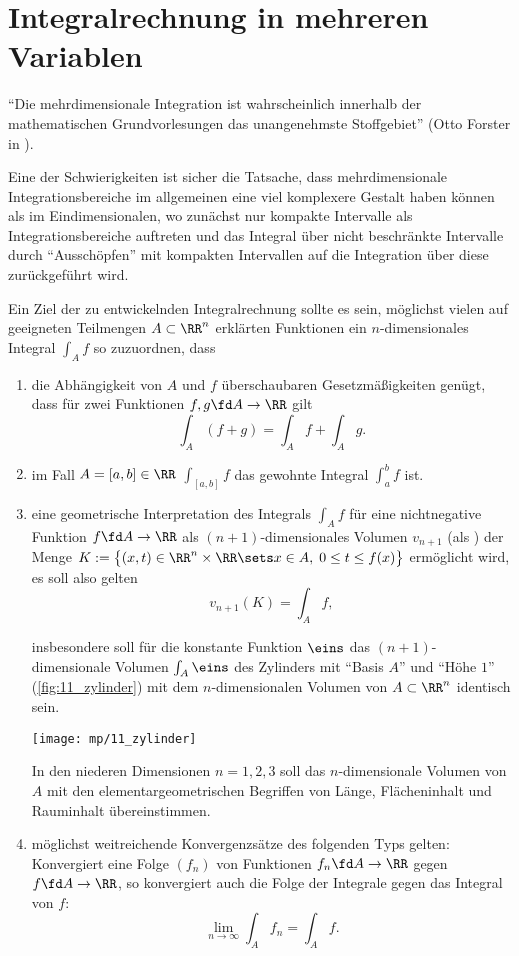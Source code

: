 \chapter{Integralrechnung in mehreren Variablen} 

"`Die mehrdimensionale Integration ist wahrscheinlich innerhalb der 
mathematischen Grundvorlesungen das unangenehmste Stoffgebiet"' (Otto 
Forster in \citep{Forster}).

Eine der Schwierigkeiten ist sicher die Tatsache, dass mehrdimensionale 
Integrationsbereiche im allgemeinen eine viel komplexere Gestalt haben können 
als im Eindimensionalen, wo zunächst nur kompakte Intervalle als 
Integrationsbereiche auftreten und das Integral über nicht beschränkte 
Intervalle durch "`Ausschöpfen"' mit kompakten Intervallen auf die 
Integration über diese zurückgeführt wird. 

Ein Ziel der zu entwickelnden Integralrechnung sollte es sein, möglichst 
vielen auf geeigneten Teilmengen $A\subset\RR^n$ erklärten Funktionen 
ein $n$-dimensionales Integral $\int_A f$ so zuzuordnen, dass 
\begin{enumerate}
\item die Abhängigkeit von $A$ und $f$ überschaubaren Gesetzmäßigkeiten 
  genügt, {\zB} dass für zwei Funktionen $f,g \fd A\to \RR$ gilt 
  \[
  \int_A (f+g) = \int_A f + \int_A g.
  \]
\item im Fall $A=[a,b]\in \RR$ $\int_{[a,b]} f$ das gewohnte Integral 
  $\int_a^b f$ ist. 
\item eine geometrische Interpretation des Integrals $\int_A f$ für eine 
  nichtnegative Funktion $f\fd A\to \RR$ als $(n+1)$-dimensionales Volumen 
  $v_{n+1}$ (als ) der Menge 
  $
  K := \big\{ (x,t) \in \RR^n \times \RR \sets x\in A, \; 0 \le t \le f(x) \big\}
  $ ermöglicht wird, es soll also gelten 
  \[
  v_{n+1}( K) =\int_A f,
  \]

  insbesondere soll für die konstante 
  Funktion $\eins$ das $(n+1)$-dimensionale Volumen $\int_A \eins$ des Zylinders 
  mit "`Basis $A$"' und "`Höhe $1$"' (\Abb\ref{fig:11_zylinder}) mit dem $n$-dimensionalen Volumen 
  von $A\subset\RR^n$ identisch sein. 

  \begin{center}
    \texttt{[image: mp/11\_zylinder]}
    \label{fig:11_zylinder}
  \end{center}

  In den niederen Dimensionen $n=1,2,3$ 
  soll das $n$-dimensionale Volumen von $A$ mit den elementargeometrischen 
  Begriffen von Länge, Flächeninhalt und Rauminhalt übereinstimmen. 
\item möglichst weitreichende Konvergenzsätze des folgenden Typs 
  gelten: Konvergiert eine Folge $(f_n)$ von Funktionen $f_n \fd A\to \RR$ 
  gegen $f\fd A\to\RR$, so konvergiert auch die Folge der Integrale gegen 
  das Integral von $f$:
  \[
  \lim_{n\to\infty} \int_A f_n = \int_A f.
  \]
\end{enumerate}

